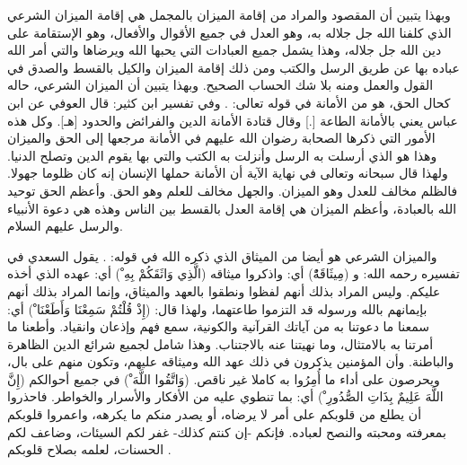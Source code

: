 وبهذا يتبين أن المقصود والمراد من إقامة الميزان بالمجمل هي إقامة الميزان الشرعي الذي كلفنا الله جل جلاله به، وهو العدل في جميع الأقوال والأفعال، وهو الإستقامة على دين الله جل جلاله، وهذا يشمل جميع العبادات التي يحبها الله ويرضاها والتي أمر الله عباده بها عن طريق الرسل والكتب ومن ذلك إقامة الميزان والكيل بالقسط والصدق في القول والعمل ومنه بلا شك الحساب الصحيح. وبهذا يتبين أن الميزان الشرعي، حاله كحال الحق، هو من الأمانة في قوله تعالى:
\quranayah*[33][72]{\footnotesize \surahname*[33]}. وفي تفسير ابن كثير: قال العوفي عن ابن عباس يعني بالأمانة الطاعة [.] وقال قتادة الأمانة الدين والفرائض والحدود [هـ]. وكل هذه الأمور التي ذكرها الصحابة رضوان الله عليهم في الأمانة مرجعها إلى الحق والميزان وهذا هو الذي أرسلت به الرسل وأنزلت به الكتب والتي بها يقوم الدين وتصلح الدنيا. ولهذا قال سبحانه وتعالى في نهاية الآية أن الأمانة حملها الإنسان إنه كان ظلوما جهولا. فالظلم مخالف للعدل وهو الميزان. والجهل مخالف للعلم وهو الحق. وأعظم الحق توحيد الله بالعبادة، وأعظم الميزان هي إقامة العدل بالقسط بين الناس وهذه هي دعوة الأنبياء والرسل عليهم السلام.

والميزان الشرعي هو أيضا من الميثاق الذي ذكره الله في قوله:
\quranayah*[5][7]{\footnotesize \surahname*[5]}. يقول السعدي في تفسيره رحمه الله:
و (مِيثَاقَهُْ) أي: واذكروا ميثاقه (الَّذِي وَاثَقَكُمْ بِهِ ْ) أي: عهده الذي أخذه عليكم. وليس المراد بذلك أنهم لفظوا ونطقوا بالعهد والميثاق، وإنما المراد بذلك أنهم بإيمانهم بالله ورسوله قد التزموا طاعتهما، ولهذا قال: (إِذْ قُلْتُمْ سَمِعْنَا وَأَطَعْنَا ْ) أي: سمعنا ما دعوتنا به من آياتك القرآنية والكونية، سمع فهم وإذعان وانقياد. وأطعنا ما أمرتنا به بالامتثال، وما نهيتنا عنه بالاجتناب. وهذا شامل لجميع شرائع الدين الظاهرة والباطنة. وأن المؤمنين يذكرون في ذلك عهد الله وميثاقه عليهم، وتكون منهم على بال، ويحرصون على أداء ما أُمِرُوا به كاملا غير ناقص. (وَاتَّقُوا اللَّهَ ْ) في جميع أحوالكم (إِنَّ اللَّهَ عَلِيمٌ بِذَاتِ الصُّدُورِ ْ) أي: بما تنطوي عليه من الأفكار والأسرار والخواطر. فاحذروا أن يطلع من قلوبكم على أمر لا يرضاه، أو يصدر منكم ما يكرهه، واعمروا قلوبكم بمعرفته ومحبته والنصح لعباده. فإنكم -إن كنتم كذلك- غفر لكم السيئات، وضاعف لكم الحسنات، لعلمه بصلاح قلوبكم \cite{tafsir_Saadi}.

